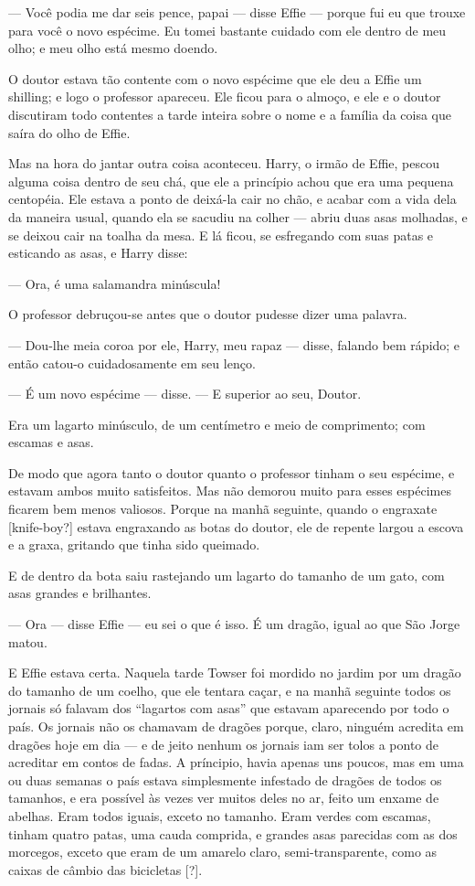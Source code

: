 — Você podia me dar seis pence, papai — disse Effie — porque fui eu
que trouxe para você o novo espécime. Eu tomei bastante cuidado com
ele dentro de meu olho; e meu olho está mesmo doendo.

O doutor estava tão contente com o novo espécime que ele deu a Effie
um shilling; e logo o professor apareceu. Ele ficou para o almoço, e
ele e o doutor discutiram todo contentes a tarde inteira sobre o nome
e a família da coisa que saíra do olho de Effie.

Mas na hora do jantar outra coisa aconteceu. Harry, o irmão de Effie,
pescou alguma coisa dentro de seu chá, que ele a princípio achou que
era uma pequena centopéia. Ele estava a ponto de deixá-la cair no
chão, e acabar com a vida dela da maneira usual, quando ela se
sacudiu na colher — abriu duas asas molhadas, e se deixou cair na
toalha da mesa. E lá ficou, se esfregando com suas patas e esticando
as asas, e Harry disse:

— Ora, é uma salamandra minúscula!

O professor debruçou-se antes que o doutor pudesse dizer uma palavra.

— Dou-lhe meia coroa por ele, Harry, meu rapaz — disse, falando bem
rápido; e então catou-o cuidadosamente em seu lenço.

— É um novo espécime — disse. — E superior ao seu, Doutor.

Era um lagarto minúsculo, de um centímetro e meio de comprimento; com
escamas e asas.

De modo que agora tanto o doutor quanto o professor tinham o seu
espécime, e estavam ambos muito satisfeitos. Mas não demorou muito
para esses espécimes ficarem bem menos valiosos. Porque na manhã
seguinte, quando o engraxate [knife-boy?] estava engraxando as botas
do doutor, ele de repente largou a escova e a graxa, gritando que
tinha sido queimado.

E de dentro da bota saiu rastejando um lagarto do tamanho de um gato,
com asas grandes e brilhantes.

— Ora — disse Effie — eu sei o que é isso. É um dragão, igual ao que
São Jorge matou.

E Effie estava certa. Naquela tarde Towser foi mordido no jardim por
um dragão do tamanho de um coelho, que ele tentara caçar, e na manhã
seguinte todos os jornais só falavam dos “lagartos com asas” que
estavam aparecendo por todo o país. Os jornais não os chamavam de
dragões porque, claro, ninguém acredita em dragões hoje em dia — e de
jeito nenhum os jornais iam ser tolos a ponto de acreditar em contos
de fadas. A príncipio, havia apenas uns poucos, mas em uma ou duas
semanas o país estava simplesmente infestado de dragões de todos os
tamanhos, e era possível às vezes ver muitos deles no ar, feito um
enxame de abelhas. Eram todos iguais, exceto no tamanho. Eram verdes
com escamas, tinham quatro patas, uma cauda comprida, e grandes asas
parecidas com as dos morcegos, exceto que eram de um amarelo claro,
semi-transparente, como as caixas de câmbio das bicicletas [?].

